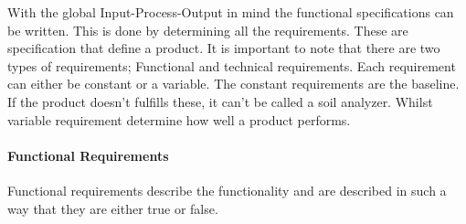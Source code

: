 With the global Input-Process-Output in mind the functional specifications can be written. This is done by determining all the requirements. These are specification that define a product. It is important to note that there are two types of requirements; Functional and  technical requirements. Each requirement can either be constant or a variable. The constant requirements are the baseline. If the product doesn't fulfills these, it can't be called a soil analyzer. Whilst variable requirement determine how well a product performs. 

\paragraph{Functional Requirements}
Functional requirements describe the functionality and are described in such a way that they are either true or false.


